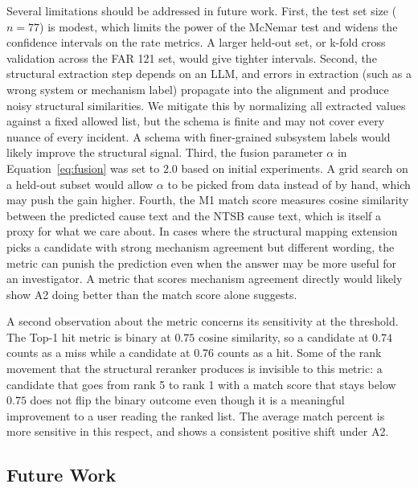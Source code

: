 \documentclass[11pt]{article}
\begin{document}
Several limitations should be addressed in future work. First, the test set size ($n = 77$) is modest, which limits the power of the McNemar test and widens the confidence intervals on the rate metrics. A larger held-out set, or k-fold cross validation across the FAR 121 set, would give tighter intervals. Second, the structural extraction step depends on an LLM, and errors in extraction (such as a wrong system or mechanism label) propagate into the alignment and produce noisy structural similarities. We mitigate this by normalizing all extracted values against a fixed allowed list, but the schema is finite and may not cover every nuance of every incident. A schema with finer-grained subsystem labels would likely improve the structural signal. Third, the fusion parameter $\alpha$ in Equation~\ref{eq:fusion} was set to $2.0$ based on initial experiments. A grid search on a held-out subset would allow $\alpha$ to be picked from data instead of by hand, which may push the gain higher. Fourth, the M1 match score measures cosine similarity between the predicted cause text and the NTSB cause text, which is itself a proxy for what we care about. In cases where the structural mapping extension picks a candidate with strong mechanism agreement but different wording, the metric can punish the prediction even when the answer may be more useful for an investigator. A metric that scores mechanism agreement directly would likely show A2 doing better than the match score alone suggests.

A second observation about the metric concerns its sensitivity at the threshold. The Top-1 hit metric is binary at $0.75$ cosine similarity, so a candidate at $0.74$ counts as a miss while a candidate at $0.76$ counts as a hit. Some of the rank movement that the structural reranker produces is invisible to this metric: a candidate that goes from rank 5 to rank 1 with a match score that stays below $0.75$ does not flip the binary outcome even though it is a meaningful improvement to a user reading the ranked list. The average match percent is more sensitive in this respect, and shows a consistent positive shift under A2.

\subsection{Future Work}
\label{sec:conclusion:future}
\end{document}
